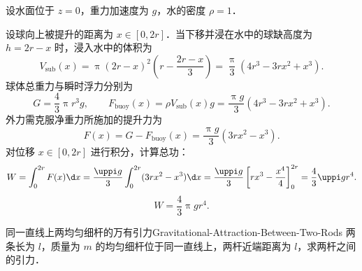 \begin{solution}
    设水面位于 $z = 0$，重力加速度为 $g$，水的密度 $\rho = 1$．

    设球向上被提升的距离为 $x \in [0, 2r]$．当下移并浸在水中的球缺高度为 $h = 2r - x$ 时，浸入水中的体积为
    \begin{equation}
        V_{\text{sub}}(x) = \uppi (2r - x)^2 \left( r - \frac{2r - x}{3} \right) = \frac{\uppi}{3}(4r^3 - 3rx^2 + x^3).
    \end{equation}
    球体总重力与瞬时浮力分别为
    \begin{equation}
        G = \frac{4}{3}\uppi r^3 g, \qquad F_{\text{buoy}}(x) = \rho V_{\text{sub}}(x) g = \frac{\uppi g}{3}(4r^3 - 3rx^2 + x^3).
    \end{equation}
    外力需克服净重力所施加的提升力为
    \begin{equation}
        F(x) = G - F_{\text{buoy}}(x) = \frac{\uppi g}{3}(3rx^2 - x^3).
    \end{equation}
    对位移 $x \in [0, 2r]$ 进行积分，计算总功：
    \begin{equation}
        W = \int_0^{2r} F(x)\d x = \frac{\uppi g}{3}\int_0^{2r} (3rx^2 - x^3)\d x = \frac{\uppi g}{3}\left[ rx^3 - \frac{x^4}{4} \right]_0^{2r} = \frac{4}{3}\uppi g r^4.
    \end{equation}
    \begin{equation}
        \boxed{W = \frac{4}{3}\uppi g r^4.}
    \end{equation}
\end{solution}

\begin{problem}{同一直线上两均匀细杆的万有引力}{Gravitational-Attraction-Between-Two-Rods}
    两条长为 $l$，质量为 $m$ 的均匀细杆位于同一直线上，两杆近端距离为 $l$，求两杆之间的引力．
\end{problem}

